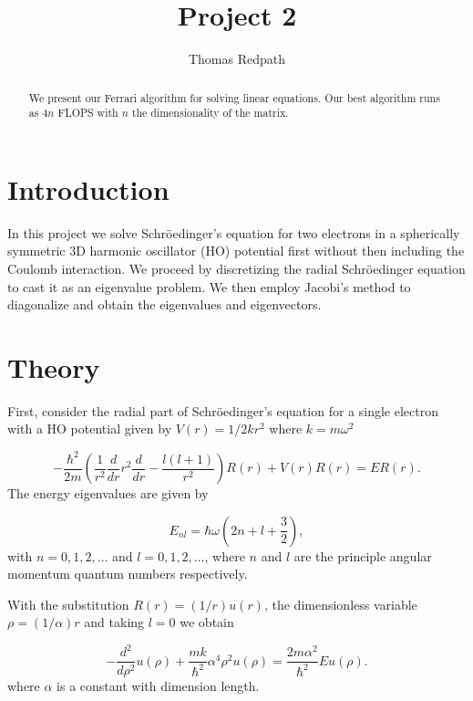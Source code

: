 \documentclass[10pt,showpacs,preprintnumbers,footinbib,amsmath,amssymb,aps,prl,twocolumn,groupedaddress,superscriptaddress,showkeys]{revtex4-1}
\begin{document}
\title{Project 2}
\author{Thomas Redpath}
\begin{abstract}
We present our Ferrari algorithm for solving linear equations. Our best algorithm runs as $4n$ FLOPS with $n$ the dimensionality of the matrix.
\end{abstract}
\maketitle

\section{Introduction}

In this project we solve Schr\"{o}edinger's equation for two electrons
in a spherically symmetric 3D harmonic oscillator (HO) potential first
without then including the Coulomb interaction. We proceed by
discretizing the radial Schr\"{o}edinger equation to cast it as an
eigenvalue problem. We then employ Jacobi's method to diagonalize
and obtain the eigenvalues and eigenvectors.

\section{Theory}

First, consider the radial part of Schr\"{o}edinger's equation for a
single electron with a HO potential given by $V(r) = 1/2 kr^2$
where $k = m \omega^2$

\begin{equation*}
  -\frac{\hbar^2}{2 m} \left ( \frac{1}{r^2} \frac{d}{dr} r^2
  \frac{d}{dr} - \frac{l (l + 1)}{r^2} \right )R(r) 
     + V(r) R(r) = E R(r).
\end{equation*}
The energy eigenvalues are given by

\begin{equation*}
E_{nl}=  \hbar \omega \left(2n+l+\frac{3}{2}\right),
\end{equation*}
with $n=0,1,2,\dots$ and $l=0,1,2,\dots$, where $n$ and $l$
are the principle angular momentum quantum numbers
respectively.

With the substitution $R(r) = (1/r) u(r)$, the dimensionless variable
$\rho = (1/ \alpha) r$ and taking $l=0$ we obtain

\begin{equation*}
  -\frac{d^2}{d\rho^2} u(\rho) 
       + \frac{mk}{\hbar^2} \alpha^4\rho^2u(\rho)  = \frac{2m\alpha^2}{\hbar^2}E u(\rho) .
\end{equation*}
where $\alpha$ is a constant with dimension length.
\end{document}

